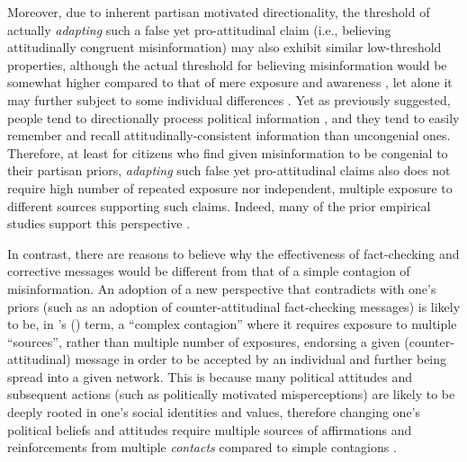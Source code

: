 \documentclass[man, 12pt, a4paper, nolmodern, noextraspace]{apa6}
\begin{document}
    Moreover, due to inherent partisan motivated directionality, the threshold of actually \emph{adapting} such a false yet pro-attitudinal claim (i.e., believing attitudinally congruent misinformation) may also exhibit similar low-threshold properties, although the actual threshold for believing misinformation would be somewhat higher compared to that of mere exposure and awareness \parencite[e.g.,][]{Monsted_plos2017}, let alone it may further subject to some individual differences \parencite[e.g.,][]{weeks2015emotions, flynn2017nature}. Yet as previously suggested, people tend to directionally process political information \parencite{taber2006}, and they tend to easily remember and recall attitudinally-consistent information than uncongenial ones. Therefore, at least for citizens who find given misinformation to be congenial to their partisan priors, \emph{adapting} such false yet pro-attitudinal claims also does not require high number of repeated exposure nor independent, multiple exposure to different sources supporting such claims. Indeed, many of the prior empirical studies support this perspective \parencite[e.g.,][]{garrett2016driving, kuklinski2000misinformation, flynn2017nature}.         
    
    In contrast, there are reasons to believe why the effectiveness of fact-checking and corrective messages would be different from that of a simple contagion of misinformation. An adoption of a new perspective that contradicts with one's priors (such as an adoption of counter-attitudinal fact-checking messages) is likely to be, in \citeauthor{centola2007complex}'s (\citeyear{centola2007complex}) term, a \enquote{complex contagion} where it requires exposure to multiple \enquote{sources}, rather than multiple number of exposures, endorsing a given (counter-attitudinal) message in order to be accepted by an individual and further being spread into a given network. This is because many political attitudes and subsequent actions (such as politically motivated misperceptions) are likely to be deeply rooted in one’s social identities and values, therefore changing one's political beliefs and attitudes require multiple sources of affirmations and reinforcements from multiple \emph{contacts} compared to simple contagions \parencite[e.g.,][]{gonzalez2017decoding, larson2016social, siegel2009social}. 
    
\end{document}
